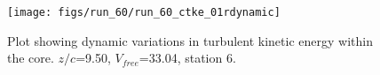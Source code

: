 \begin{figure}[H]
\centering
\texttt{[image: figs/run\_60/run\_60\_ctke\_01rdynamic]}
\caption{Plot showing dynamic variations in turbulent kinetic energy within the core. $z/c$=9.50, $V_{free}$=33.04, station 6.}
\label{fig:run_60_ctke_01rdynamic}
\end{figure}


